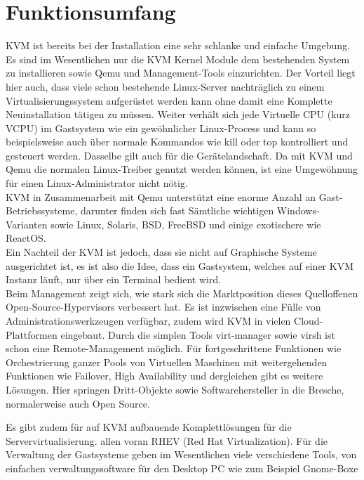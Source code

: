 \documentclass[14pt]{extreport}
\begin{document}
\section{Funktionsumfang}
KVM ist bereits bei der Installation eine sehr schlanke und einfache Umgebung. 
Es sind im Wesentlichen nur die KVM Kernel Module dem bestehenden System zu installieren sowie Qemu und Management-Tools einzurichten. Der Vorteil liegt hier auch, dass viele schon bestehende Linux-Server nachträglich zu einem Virtualisierungssystem aufgerüstet werden kann ohne damit eine Komplette Neuinstallation tätigen zu müssen.
Weiter verhält sich jede  Virtuelle CPU (kurz VCPU) im Gastsystem wie ein gewöhnlicher Linux-Process und kann so beispielsweise auch über normale Kommandos wie kill oder top kontrolliert und gesteuert werden. Dasselbe gilt auch für die Gerätelandschaft. Da mit KVM und Qemu die normalen Linux-Treiber genutzt werden können, ist eine Umgewöhnung für einen Linux-Administrator nicht nötig.\\

KVM in Zusammenarbeit mit Qemu unterstützt eine enorme Anzahl an Gast-Betriebssysteme, darunter finden sich fast Sämtliche wichtigen Windows-Varianten sowie Linux, Solaris, BSD, FreeBSD und einige exotischere wie ReactOS.\\

Ein Nachteil der KVM ist jedoch, dass sie nicht auf Graphische Systeme ausgerichtet ist, es ist also die Idee, dass ein Gastsystem, welches auf einer KVM Instanz läuft, nur über ein Terminal bedient wird.\\
Beim Management zeigt sich, wie stark sich die Marktposition dieses Quelloffenen Open-Source-Hypervisors verbessert hat. Es ist inzwischen eine Fülle von Administrationswerkzeugen verfügbar, zudem wird KVM in vielen Cloud-Plattformen eingebaut.
Durch die simplen Tools virt-manager sowie virsh ist schon eine Remote-Management möglich. Für fortgeschrittene Funktionen wie Orchestrierung ganzer Pools von Virtuellen Maschinen mit weitergehenden Funktionen wie Failover, High Availability und dergleichen gibt es weitere Lösungen. Hier springen Dritt-Objekte sowie Softwarehersteller in die Bresche, normalerweise auch Open Source. 

Es gibt zudem für auf KVM aufbauende Komplettlösungen für die Servervirtualisierung. allen voran RHEV (Red Hat Virtualization).
Für die Verwaltung der Gastsysteme geben im Wesentlichen viele verschiedene Tools, von einfachen verwaltungssoftware für den Desktop PC wie zum Beispiel Gnome-Boxe
\end{document}
